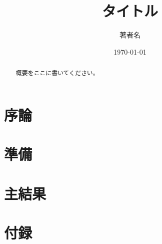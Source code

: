 \documentclass[
  paper=a4,
  fontsize=11pt,
  jafontsize=11pt,
  leqno
]{jlreq}
\title{タイトル}
\author{著者名}
\date{\today}
\begin{document}
\begin{abstract}
概要をここに書いてください。
\end{abstract}

\maketitle


\section{序論}


\section{準備}


\section{主結果}


\appendix

\section{付録}


\printbibliography
\end{document}
